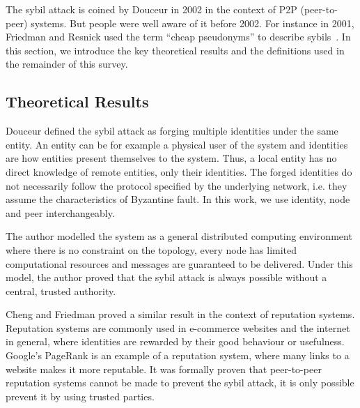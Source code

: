 The sybil attack is coined by Douceur\cite{douceur2002sybil} in 2002 in the
context of P2P (peer-to-peer) systems. But people were well aware of it before
2002. For instance in 2001, Friedman and Resnick used the term ``cheap
pseudonyms'' to describe sybils~\cite{resnick2001social}. In this section, we
introduce the key theoretical results and the definitions used in the remainder
of this survey.

\subsection{Theoretical Results}\label{sec:sybil-theory}
Douceur defined the sybil attack as forging multiple identities under the same
entity\cite{douceur2002sybil}. An entity can be for example a physical user of
the system and identities are how entities present themselves to the system.
Thus, a local entity has no direct knowledge of remote entities, only their
identities. The forged identities do not necessarily follow the protocol
specified by the underlying network, i.e. they assume the characteristics of
Byzantine fault\cite{lamport1982byzantine}. In this work, we use identity, node
and peer interchangeably.

The author modelled the system as a general distributed computing environment
where there is no constraint on the topology, every node has limited
computational resources and messages are guaranteed to be delivered. Under this
model, the author proved that the sybil attack is always possible without a
central, trusted authority.


Cheng and Friedman proved a similar result in the context of reputation
systems\cite{cheng2005sybilproof}. Reputation systems are commonly used in
e-commerce websites and the internet in general, where identities are rewarded
by their good behaviour or usefulness. Google's PageRank\cite{page1999pagerank}
is an example of a reputation system, where many links to a website makes it
more reputable. It was formally proven that peer-to-peer reputation systems
cannot be made to prevent the sybil attack, it is only possible prevent it by
using trusted parties.

